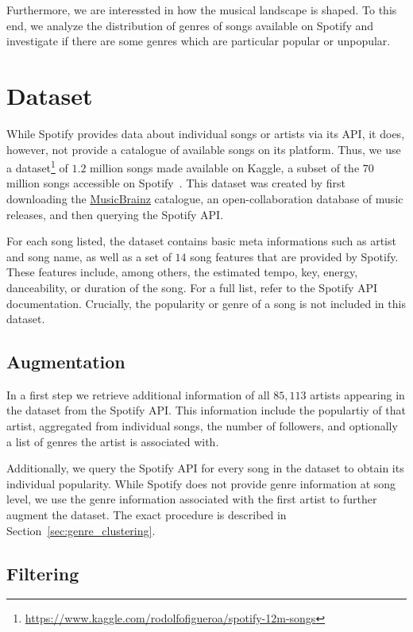 \documentclass{article}
\begin{document}
Furthermore, we are interessted in how the musical landscape is shaped. To this end, we analyze the distribution of genres of songs available on Spotify and investigate if there are some genres which are particular popular or unpopular.

\section{Dataset}
\label{sec:dataset}

While Spotify provides data about individual songs or artists via its API, it does, however, not provide a catalogue of available songs on its platform. Thus, we use a dataset\footnote{\url{https://www.kaggle.com/rodolfofigueroa/spotify-12m-songs}} of $1.2$ million songs made available on Kaggle, a subset of the $70$ million songs accessible on Spotify~\cite{ingham_2020}. This dataset was created by first downloading the \href{https://musicbrainz.org/}{MusicBrainz} catalogue, an open-collaboration database of music releases, and then querying the Spotify API. 

For each song listed, the dataset contains basic meta informations such as artist and song name, as well as a set of $14$ song features that are provided by Spotify. These features include, among others, the estimated tempo, key, energy, danceability, or duration of the song. For a full list, refer to the Spotify API documentation. Crucially, the popularity or genre of a song is not included in this dataset.

\subsection{Augmentation}
In a first step we retrieve additional information of all $85,113$ artists appearing in the dataset from the Spotify API. This information include the populartiy of that artist, aggregated from individual songs, the number of followers, and optionally a list of genres the artist is associated with.

Additionally, we query the Spotify API for every song in the dataset to obtain its individual popularity. While Spotify does not provide genre information at song level, we use the genre information associated with the first artist to further augment the dataset. The exact procedure is described in Section~\ref{sec:genre_clustering}. 

\subsection{Filtering}
\end{document}

